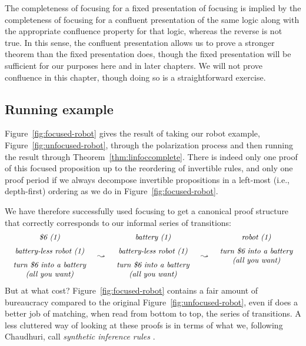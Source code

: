 The completeness of focusing for a fixed presentation of focusing is
implied by the completeness of focusing for a confluent presentation
of the same logic along with the appropriate confluence property for
that logic, whereas the reverse is not true. In this sense, the
confluent presentation allows us to prove a stronger theorem than the
fixed presentation does, though the fixed presentation will be
sufficient for our purposes here and in later chapters. We will not
prove confluence in this chapter, though doing so is a straightforward
exercise.

\subsection{Running example}



Figure~\ref{fig:focused-robot} gives the result of taking our robot
example, Figure~\ref{fig:unfocused-robot}, through the polarization
process and then running the result through
Theorem~\ref{thm:linfoccomplete}. There is indeed only one proof of
this focused proposition up to the reordering of invertible rules, and
only one proof period if we always decompose invertible propositions
in a left-most (i.e., depth-first) ordering as we do in
Figure~\ref{fig:focused-robot}.

We have therefore successfully used focusing to get a canonical
proof structure that correctly corresponds to our 
informal series of transitions:
\[
\begin{array}{ccccc}
\begin{array}{c}
\mbox{\it \$6 (1)}\medskip\\ 
\mbox{\it battery-less robot (1)} \medskip\\ 
\mbox{\it turn \$6 into a battery}\\
\mbox{\it (all you want)}
\end{array}
& \leadsto &
\begin{array}{c}
\mbox{\it battery  (1)}\medskip\\ 
\mbox{\it battery-less robot (1)} \medskip\\ 
\mbox{\it turn \$6 into a battery}\\
\mbox{\it (all you want)}
\end{array}
& \leadsto &
\begin{array}{c}
\mbox{\it robot (1)} \medskip\\ 
\mbox{\it turn \$6 into a battery}\\
\mbox{\it (all you want)}\medskip\\~\\
\end{array}
\end{array}
\]
But at what cost? Figure~\ref{fig:focused-robot} contains a
fair amount of bureaucracy compared to the original
Figure~\ref{fig:unfocused-robot}, even if does a better job of
matching, when read from bottom to top, the series of transitions. A
less cluttered way of looking at these proofs is in terms of what we,
following Chaudhuri, call {\it synthetic inference rules}
\cite{chaudhuri08focusing}.

